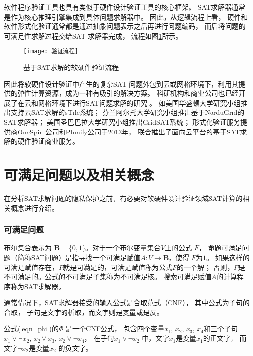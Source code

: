 软件程序验证工具也具有类似于硬件设计验证工具的核心框架。
SAT求解器通常是作为核心推理引擎集成到具体问题求解器中。
因此，从逻辑流程上看，
硬件和软件形式化验证通常都是通过抽象问题表示之后再进行问题编码，
而后将问题的可满足性求解过程交给SAT 求解器完成，
流程如图\ref{verfication-procedure}所示。

\begin{figure}[t] %
  \centering
  \texttt{[image: 验证流程]}
  \caption{基于SAT求解的软硬件验证流程}
  \label{verfication-procedure}
\end{figure}

因此将软硬件设计验证中产生的复杂SAT 问题外包到云或网格环境下，利用其提供的弹性计算资源，成为一种有吸引的解决方案。
科研机构和商业公司也已经开展了在云和网格环境下进行SAT问题求解的研究
。
如美国华盛顿大学研究小组推出支持云SAT求解的sTile系统；
芬兰阿尔托大学研究小组推出基于NorduGrid的SAT求解器；
美国圣巴巴拉大学研究小组推出GridSAT系统；
形式化验证服务提供商OneSpin 公司和Plunify公司于2013年，
联合推出了面向云平台的基于SAT求解的硬件验证商业服务。

\section{可满足问题以及相关概念}
在分析SAT求解问题的隐私保护之前，有必要对软硬件设计验证领域SAT计算的相关概念进行介绍。
\subsubsection{可满足问题}
布尔集合表示为 $\mathbf{B}=\{0,1\}$。对于一个布尔变量集合$V$上的公式 $F$，
命题可满足问题（简称SAT问题）是指寻找一个可满足赋值$A : V\to \mathbf{B}$，使得 $F$为$1$。
如果这样的可满足赋值存在，$F$就是可满足的，可满足赋值称为公式$F$的一个解；
否则，$F$是不可满足的。公式的不可满足子集称为不可满足核。
搜索可满足赋值$A$的计算程序称为SAT求解器。

通常情况下，SAT求解器接受的输入公式是合取范式（CNF），
其中公式为子句的合取，
子句是文字的析取，而文字则是变量或是反。

公式(\ref{eqn_phi})的$\Phi$ 是一个CNF公式，
包含四个变量$x_1$, $x_2$, $x_3$, $x_4$和三个子句 $x_1\vee \neg x_2$, $x_2\vee x_3$, $x_2\vee \neg x_4$，
在子句$x_1\vee \neg x_2$ 中，文字$x_1$是变量$x_1$的正文字，
而文字$\neg x_2$是变量$x_2$ 的负文字。


